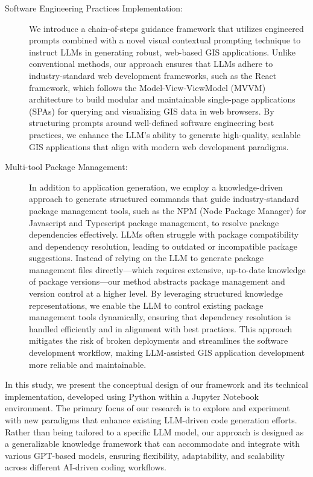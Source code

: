 \begin{description}
    \item[Software Engineering Practices Implementation: ] We introduce a chain-of-steps guidance framework that utilizes engineered prompts combined with a novel visual contextual prompting technique to instruct LLMs in generating robust, web-based GIS applications. Unlike conventional methods, our approach ensures that LLMs adhere to industry-standard web development frameworks, such as the React framework, which follows the Model-View-ViewModel (MVVM) architecture to build modular and maintainable single-page applications (SPAs) for querying and visualizing GIS data in web browsers. By structuring prompts around well-defined software engineering best practices, we enhance the LLM’s ability to generate high-quality, scalable GIS applications that align with modern web development paradigms.
    \item [Multi-tool Package Management: ] In addition to application generation, we employ a knowledge-driven approach to generate structured commands that guide industry-standard package management tools, such as the NPM (Node Package Manager) for Javascript and Typescript package management, to resolve package dependencies effectively. LLMs often struggle with package compatibility and dependency resolution, leading to outdated or incompatible package suggestions. Instead of relying on the LLM to generate package management files directly—which requires extensive, up-to-date knowledge of package versions—our method abstracts package management and version control at a higher level. By leveraging structured knowledge representations, we enable the LLM to control existing package management tools dynamically, ensuring that dependency resolution is handled efficiently and in alignment with best practices. This approach mitigates the risk of broken deployments and streamlines the software development workflow, making LLM-assisted GIS application development more reliable and maintainable.
\end{description}
In this study, we present the conceptual design of our framework and its technical implementation, developed using Python within a Jupyter Notebook environment. The primary focus of our research is to explore and experiment with new paradigms that enhance existing LLM-driven code generation efforts. Rather than being tailored to a specific LLM model, our approach is designed as a generalizable knowledge framework that can accommodate and integrate with various GPT-based models, ensuring flexibility, adaptability, and scalability across different AI-driven coding workflows.


